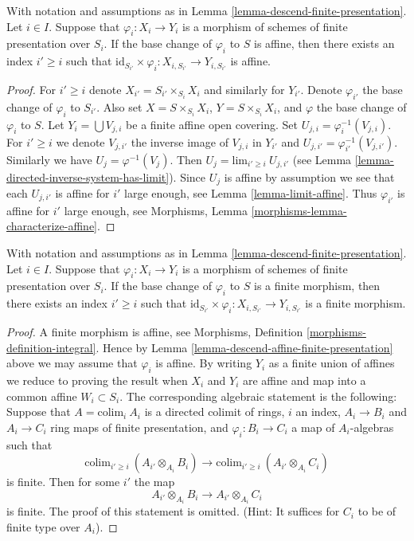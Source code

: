 \begin{lemma}
\label{lemma-descend-affine-finite-presentation}
With notation and assumptions as in
Lemma \ref{lemma-descend-finite-presentation}.
Let $i \in I$.
Suppose that $\varphi_i : X_i \to Y_i$ is a morphism of schemes
of finite presentation over $S_i$.
If the base change of $\varphi_i$ to $S$ is affine,
then there exists an index $i' \geq i$ such that
$\text{id}_{S_{i'}} \times \varphi_i : X_{i, S_{i'}} \to Y_{i, S_{i'}}$
is affine.
\end{lemma}

\begin{proof}
For $i' \geq i$ denote $X_{i'} = S_{i'} \times_{S_i} X_i$ and similarly
for $Y_{i'}$. Denote $\varphi_{i'}$ the base change of $\varphi_i$ to
$S_{i'}$. Also set $X = S \times_{S_i} X_i$, $Y =S \times_{S_i} X_i$,
and $\varphi$ the base change of $\varphi_i$ to $S$.
Let $Y_i = \bigcup V_{j, i}$ be a finite affine open covering.
Set $U_{j, i} = \varphi_i^{-1}(V_{j, i})$. For $i' \geq i$ we denote
$V_{j, i'}$ the inverse image of $V_{j, i}$ in $Y_{i'}$ and
$U_{j, i'} = \varphi_{i'}^{-1}(V_{j, i'})$. Similarly we have
$U_j = \varphi^{-1}(V_j)$. Then $U_j = \text{lim}_{i' \geq i}\ U_{j, i'}$
(see Lemma \ref{lemma-directed-inverse-system-has-limit}).
Since $U_j$ is affine by assumption we see that
each $U_{j, i'}$ is affine for $i'$ large enough, see
Lemma \ref{lemma-limit-affine}. Thus $\varphi_{i'}$ is
affine for $i'$ large enough, see
Morphisms, Lemma \ref{morphisms-lemma-characterize-affine}.
\end{proof}

\begin{lemma}
\label{lemma-descend-finite-finite-presentation}
With notation and assumptions as in
Lemma \ref{lemma-descend-finite-presentation}.
Let $i \in I$.
Suppose that $\varphi_i : X_i \to Y_i$ is a morphism of schemes
of finite presentation over $S_i$.
If the base change of $\varphi_i$ to $S$ is a finite morphism,
then there exists an index $i' \geq i$ such that
$\text{id}_{S_{i'}} \times \varphi_i : X_{i, S_{i'}} \to Y_{i, S_{i'}}$
is a finite morphism.
\end{lemma}

\begin{proof}
A finite morphism is affine, see
Morphisms, Definition \ref{morphisms-definition-integral}.
Hence by Lemma \ref{lemma-descend-affine-finite-presentation} above
we may assume that $\varphi_i$ is affine.
By writing $Y_i$ as a finite union of affines we reduce to proving
the result when $X_i$ and $Y_i$ are affine and map
into a common affine $W_i \subset S_i$. The corresponding algebraic
statement is the following: Suppose that $A = \text{colim}_i\ A_i$
is a directed colimit of rings, $i$ an index, $A_i \to B_i$
and $A_i \to C_i$ ring maps of finite presentation, and
$\varphi_i : B_i \to C_i$ a map of $A_i$-algebras such that
$$
\text{colim}_{i' \geq i}\ (A_{i'} \otimes_{A_i} B_i)
\longrightarrow
\text{colim}_{i' \geq i}\ (A_{i'} \otimes_{A_i} C_i)
$$
is finite. Then for some $i'$ the map
$$
A_{i'} \otimes_{A_i} B_i
\longrightarrow
A_{i'} \otimes_{A_i} C_i
$$
is finite. The proof of this statement is omitted. (Hint: It
suffices for $C_i$ to be of finite type over $A_i$).
\end{proof}

